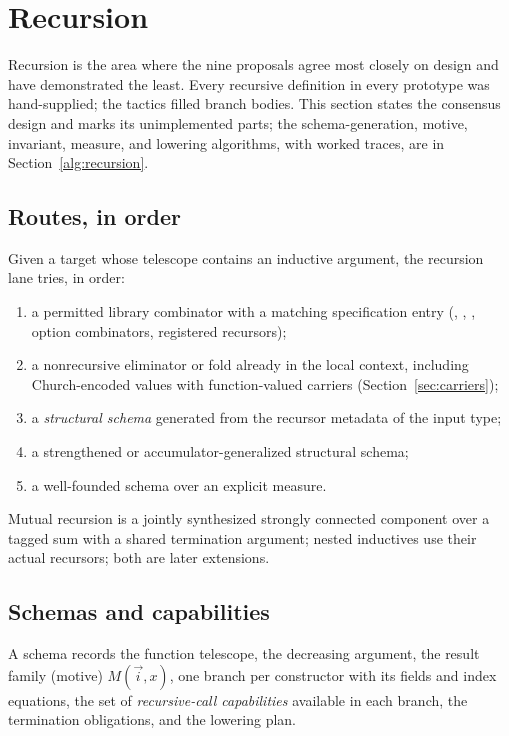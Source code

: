 \section{Recursion}\label{sec:recursion}

Recursion is the area where the nine proposals agree most closely on design and have demonstrated the least. Every recursive definition in every prototype was hand-supplied; the tactics filled branch bodies. This section states the consensus design and marks its unimplemented parts; the schema-generation, motive, invariant, measure, and lowering algorithms, with worked traces, are in Section~\ref{alg:recursion}.

\subsection{Routes, in order}

Given a target whose telescope contains an inductive argument, the recursion lane tries, in order:
\begin{enumerate}
\item a permitted library combinator with a matching specification entry (, , , option combinators, registered recursors);
\item a nonrecursive eliminator or fold already in the local context, including Church-encoded values with function-valued carriers (Section~\ref{sec:carriers});
\item a \emph{structural schema} generated from the recursor metadata of the input type;
\item a strengthened or accumulator-generalized structural schema;
\item a well-founded schema over an explicit measure.
\end{enumerate}
Mutual recursion is a jointly synthesized strongly connected component over a tagged sum with a shared termination argument; nested inductives use their actual recursors; both are later extensions.

\subsection{Schemas and capabilities}

\begin{definition}
A schema records the function telescope, the decreasing argument, the result family (motive) $M(\vec i, x)$, one branch per constructor with its fields and index equations, the set of \emph{recursive-call capabilities} available in each branch, the termination obligations, and the lowering plan.
\end{definition}

